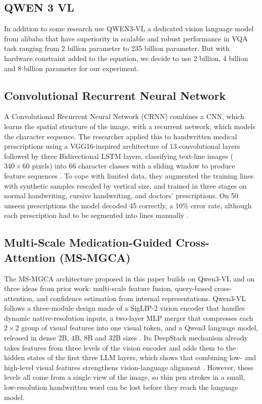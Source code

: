\documentclass[conference, a4paper]{IEEEtran}
\begin{document}
\subsection{QWEN 3 VL}
In addition to some research use QWEN3-VL a dedicated vision language model from alibaba that have superiority in scalable and robust performance in VQA task ranging from 2 billion parameter to 235 billion parameter. But with hardware constraint added to the equation, we decide to use 2 billion, 4 billion and 8 billion parameter for our experiment. \cite{lopez2026comparative}

\subsection{Convolutional Recurrent Neural Network}
A Convolutional Recurrent Neural Network (CRNN) combines a CNN, which learns the spatial structure of the image, with a recurrent network, which models the character sequence. The researcher applied this to handwritten medical prescriptions using a VGG16-inspired architecture of 13 convolutional layers followed by three Bidirectional LSTM layers, classifying text-line images ($340 \times 60$ pixels) into 66 character classes with a sliding window to produce feature sequences \cite{achkar2019medical}. To cope with limited data, they augmented the training lines with synthetic samples rescaled by vertical size, and trained in three stages on normal handwriting, cursive handwriting, and doctors' prescriptions. On 50 unseen prescriptions the model decoded 45 correctly, a 10\% error rate, although each prescription had to be segmented into lines manually \cite{achkar2019medical}.

\subsection{Multi-Scale Medication-Guided Cross-Attention (MS-MGCA)}
The MS-MGCA architecture proposed in this paper builds on Qwen3-VL and on three ideas from prior work: multi-scale feature fusion, query-based cross-attention, and confidence estimation from internal representations. Qwen3-VL follows a three-module design made of a SigLIP-2 vision encoder that handles dynamic native-resolution inputs, a two-layer MLP merger that compresses each $2 \times 2$ group of visual features into one visual token, and a Qwen3 language model, released in dense 2B, 4B, 8B and 32B sizes \cite{bai2025qwen3vl}. Its DeepStack mechanism already takes features from three levels of the vision encoder and adds them to the hidden states of the first three LLM layers, which shows that combining low- and high-level visual features strengthens vision-language alignment \cite{bai2025qwen3vl}. However, these levels all come from a single view of the image, so thin pen strokes in a small, low-resolution handwritten word can be lost before they reach the language model.
\end{document}

